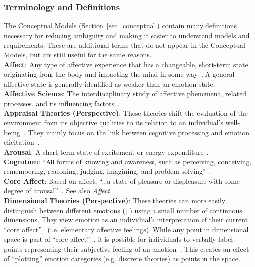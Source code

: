 \subsubsection{Terminology and  Definitions}\label{sec_terms}
The Conceptual Models (Section~\ref{sec_conceptual}) contain many definitions 
necessary for reducing ambiguity and making it easier to understand models and 
requirements. These are additional terms that do not appear in the Conceptual 
Models, but are still useful for the same reasons. \\

\noindent\textbf{Affect}: Any type of affective experience that has a
changeable, short-term state originating from the body and impacting the
mind in some way~\citep{barrett2009affect, oxfordAffect}. A general
affective state is generally identified as weaker than an emotion state. \\

\noindent\textbf{Affective Science}: The interdisciplinary study of affective 
phenomena, related processes, and its influencing 
factors~\citep[p.~xiii]{davidson2003handbook}. \\

\noindent\textbf{Appraisal Theories (Perspective)}: These theories shift the 
evaluation of the environment from its objective qualities to its relation to 
an individual's well-being~\citep[p.~86]{smith2000consequences}. They mainly 
focus on the link between cognitive processing and emotion 
elicitation~\citep[p.~354]{broekens2021emotion}. \\

\noindent\textbf{Arousal}: A short-term state of excitement or energy
expenditure~\citep{oxfordArousal}. \\

\noindent\textbf{Cognition}: ``All forms of knowing and awareness, such as
perceiving, conceiving, remembering, reasoning, judging, imagining, and problem
solving''~\citep{cognitiondef}. \\

\noindent\textbf{Core Affect}: Based on affect, ``...a state of pleasure or
displeasure with some degree of arousal''~\citep[p.~170]{barrett2009affect}.
See also \textit{Affect}. \\

\noindent\textbf{Dimensional Theories (Perspective)}: These theories can more 
easily distinguish between different emotions (; 
) using a small number of continuous dimensions. 
They view emotion as an individual's interpretation of their current ``core 
affect''~\citep[p.~353]{broekens2021emotion} (i.e. elementary affective 
feelings). While any point in dimensional space is part of ``core 
affect''~\citep[p.~97]{lisetti2015and}, it is possible for individuals to 
verbally label points representing their subjective feeling of an 
emotion~\citep[p.~12]{scherer2010emotion}. This creates an effect of 
``plotting'' emotion categories (e.g. discrete theories) as points in the 
space. \\

